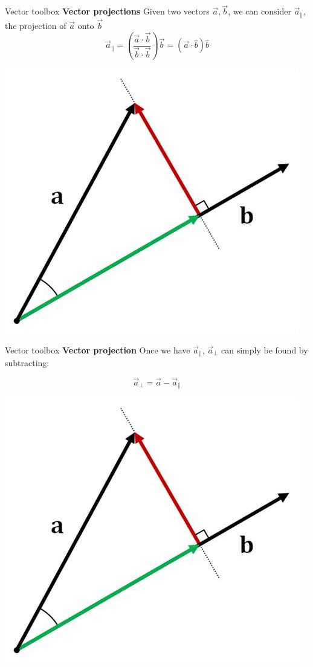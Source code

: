 \documentclass{beamer}
\begin{document}
\begin{frame}{Vector toolbox}
	\textbf{Vector projections}
	Given two vectors $\vec{a}, \vec{b}$, we can consider $\vec{a}_\parallel$, the projection of $\vec{a}$ onto $\vec{b}$
	$$\vec{a}_\parallel = \left(\dfrac{\vec{a}\cdot\vec{b}}{\vec{b}\cdot\vec{b}}\right)\vec{b} = (\vec{a}\cdot\hat{b})\hat{b}$$
	\begin{center}
	\includegraphics[width=0.50 	\linewidth]{img/vector_projection.png}
	\end{center}
\end{frame}

\begin{frame}{Vector toolbox}
	\textbf{Vector projection}
	Once we have $\vec{a}_\parallel$, $\vec{a}_\perp$ can simply be found by subtracting:
	
	$$\vec{a}_\perp = \vec{a} - \vec{a}_\parallel$$
	
	\begin{center}
	\includegraphics[width=0.50 	\linewidth]{img/vector_projection.png}
	\end{center}
\end{frame}
\end{document}
